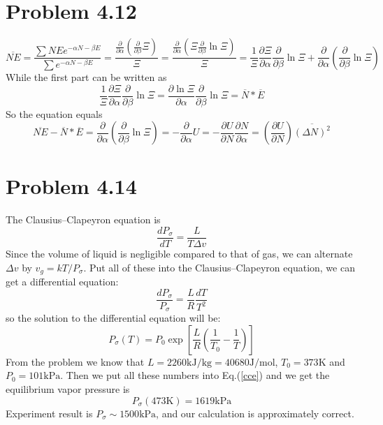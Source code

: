 \documentclass{article}
\begin{document}
\section*{Problem 4.12}
\begin{equation}
	\overline{NE}=\frac{\sum NE e^{- \alpha N- \beta E}}{\sum e^{-\alpha N-\beta E}}=\frac{\frac{\partial}{\partial \alpha}(\frac{\partial}{\partial \beta}\Xi)}{\Xi}=\frac{\frac{\partial}{\partial \alpha}(\Xi \frac{\partial}{\partial \beta}\ln \Xi)}{\Xi}=\frac{1}{\Xi} \frac{\partial \Xi}{\partial \alpha}\frac{\partial}{\partial \beta}\ln \Xi +\frac{\partial}{\partial \alpha}(\frac{\partial}{\partial \beta}\ln \Xi)
\end{equation}
	While the first part can be written as
\begin{equation}
	\frac{1}{\Xi} \frac{\partial \Xi}{\partial \alpha}\frac{\partial}{\partial \beta}\ln \Xi= \frac{\partial \ln \Xi}{\partial \alpha}\frac{\partial}{\partial \beta}\ln \Xi=\overline{N}* \overline{E}
\end{equation}
	So the equation equals
\begin{equation}
	\overline{NE}-\overline{N}* \overline{E}=\frac{\partial}{\partial \alpha}(\frac{\partial}{\partial \beta}\ln \Xi)=-\frac{\partial}{\partial \alpha} U=-\frac{\partial U}{\partial N}\frac{\partial N}{\partial \alpha}= (\frac{\partial U}{\partial N})\overline{(\Delta N)^2}
\end{equation}

\section*{Problem 4.14}
The Clausius–Clapeyron equation is
$$
\frac{dP_\sigma}{dT} = \frac{L}{T\Delta v}
$$
Since the volume of liquid is negligible compared to that of gas, we can alternate $\Delta v$ by $v_g = kT/P_\sigma$. Put all of these into the Clausius–Clapeyron equation, we can get a differential equation:
\begin{equation}
\frac{dP_\sigma}{P_\sigma} = \frac{L}{R}\frac{dT}{T^2}
\end{equation}
so the solution to the differential equation will be:
\begin{equation}\label{cce}
P_\sigma(T) = P_0\exp\left[\frac{L}{R}\left(\frac{1}{T_0}-\frac{1}{T}\right)\right]
\end{equation}
From the problem we know that $L = 2260\mathrm{kJ/kg} = 40680\mathrm{J/mol}$, $T_0 =373\mathrm{K}$ and $P_0 = 101\mathrm{kPa}$. Then we put all these numbers into Eq.(\ref{cce}) and we get the equilibrium vapor pressure is
$$
P_\sigma(473\mathrm{K}) = 1619\mathrm{kPa}
$$
Experiment result is $P_\sigma \sim 1500\mathrm{kPa}$, and our calculation is approximately correct.
\end{document}
